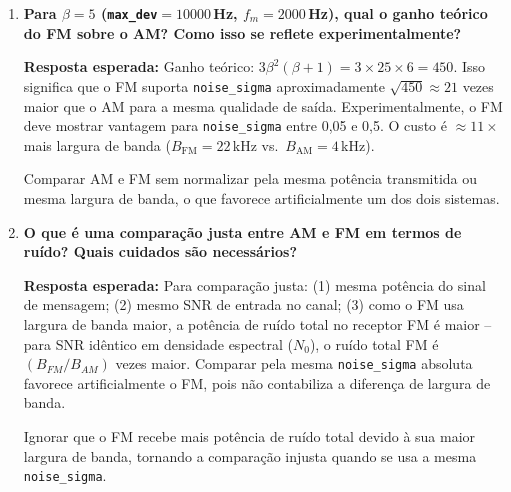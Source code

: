 \documentclass[11pt,a4paper]{article}
\begin{document}
\begin{enumerate}[label=\textbf{Q\arabic*.}, leftmargin=*, itemsep=1em]
    \begin{nota}
      Não mencionar o fenômeno de limiar do FM, ou descrevê-lo como uma degradação
      gradual semelhante ao AM, ignorando o caráter impulsivo dos cliques.
    \end{nota}

  \item \textbf{Para $\beta=5$ (\texttt{max\_dev}$= 10000$\,Hz, $f_m = 2000$\,Hz), qual o ganho teórico do FM sobre o AM? Como isso se reflete experimentalmente?}

    \textbf{Resposta esperada:} Ganho teórico:
    $3\beta^2(\beta+1) = 3 \times 25 \times 6 = 450$. Isso significa que o FM suporta
    \texttt{noise\_sigma} aproximadamente $\sqrt{450} \approx 21$ vezes maior que o AM
    para a mesma qualidade de saída. Experimentalmente, o FM deve mostrar vantagem para
    \texttt{noise\_sigma} entre 0,05 e 0,5. O custo é $\approx 11\times$ mais largura
    de banda ($B_\text{FM} = 22$\,kHz vs.\ $B_\text{AM} = 4$\,kHz).

    \begin{nota}
      Comparar AM e FM sem normalizar pela mesma potência transmitida ou mesma largura
      de banda, o que favorece artificialmente um dos dois sistemas.
    \end{nota}

  \item \textbf{O que é uma comparação justa entre AM e FM em termos de ruído? Quais cuidados são necessários?}

    \textbf{Resposta esperada:} Para comparação justa: (1) mesma potência do sinal de
    mensagem; (2) mesmo SNR de entrada no canal; (3) como o FM usa largura de banda
    maior, a potência de ruído total no receptor FM é maior -- para SNR idêntico em
    densidade espectral ($N_0$), o ruído total FM é $(B_{FM}/B_{AM})$ vezes maior.
    Comparar pela mesma \texttt{noise\_sigma} absoluta favorece artificialmente o FM,
    pois não contabiliza a diferença de largura de banda.

    \begin{nota}
      Ignorar que o FM recebe mais potência de ruído total devido à sua maior largura
      de banda, tornando a comparação injusta quando se usa a mesma \texttt{noise\_sigma}.
    \end{nota}

\end{enumerate}
\end{document}
